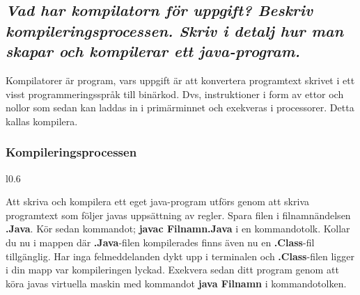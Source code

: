 \documentclass[../main.tex]{subfiles}
\begin{document}
\subsection{\textit{Vad har kompilatorn för uppgift? Beskriv kompileringsprocessen. Skriv i detalj hur man skapar och kompilerar ett java-program.}}

Kompilatorer är program, vars uppgift är att konvertera programtext skrivet i ett visst programmeringsspråk till binärkod. Dvs, instruktioner i form av
ettor och nollor som sedan kan laddas in i primärminnet och exekveras i processorer. Detta kallas kompilera.

\subsubsection{Kompileringsprocessen}

\begin{wrapfigure}{l}{0.6\textwidth}


\end{wrapfigure}

Att skriva och kompilera ett eget java-program utförs genom att skriva programtext som följer javas uppsättning av regler. Spara filen i filnamnändelsen \textbf{.Java}. Kör sedan kommandot; \textbf{javac Filnamn.Java} i en kommandotolk.  Kollar du nu i mappen där \textbf{.Java}-filen kompilerades finns även nu en \textbf{.Class}-fil tillgänglig. Har inga felmeddelanden dykt upp i terminalen och \textbf{.Class}-filen ligger i din mapp var kompileringen lyckad. Exekvera sedan ditt program genom att köra javas virtuella maskin med kommandot \textbf{java Filnamn} i kommandotolken.
\end{document}
